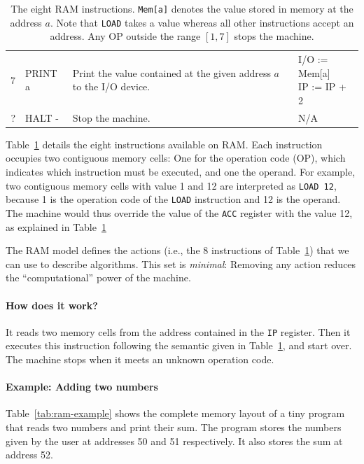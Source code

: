 \documentclass {aldast}
\begin{document}
\begin{table}[htbp]
\begin{center}
\begin{tabular}{r>{\ttfamily}lp{4cm}>{\ttfamily}p{3.5cm}}
      7  & PRINT a  & Print the value contained at the given address $a$ to the I/O device.                                       & \makecell[tl]{I/O := Mem[a]       \\ IP := IP + 2} \\[1cm]
      ?  & HALT -   & Stop the machine.                                                                                           & N/A                               \\
      \bottomrule
    \end{tabular}
  \end{center}
  \caption{The eight RAM instructions. \texttt{Mem[a]} denotes the
    value stored in memory at the address $a$. Note that \texttt{LOAD}
    takes a value whereas all other instructions accept an
    address. Any OP outside the range $[1, 7]$ stops the machine.}
  \label{tab:ram-instructions}
\end{table}

Table~\ref{tab:ram-instructions} details the eight instructions
available on RAM. Each instruction occupies two contiguous memory
cells: One for the operation code (OP), which indicates which
instruction must be executed, and one the operand. For example, two
contiguous memory cells with value 1 and 12 are interpreted as
\texttt{LOAD 12}, because 1 is the operation code of the \texttt{LOAD}
instruction and 12 is the operand. The machine would thus override the
value of the \texttt{ACC} register with the value 12, as explained in
Table~\ref{tab:ram-instructions}

\begin{takeaway}
  The RAM model defines the actions (i.e., the 8 instructions of
  Table~\ref{tab:ram-instructions}) that we can use to describe
  algorithms. This set is \emph{minimal}: Removing any action reduces
  the ``computational'' power of the machine.
\end{takeaway}

\paragraph{How does it work?} It reads two memory cells from the
address contained in the \texttt{IP} register. Then it executes this
instruction following the semantic given in
Table~\ref{tab:ram-instructions}, and start over. The machine stops
when it meets an unknown operation code.

\paragraph {Example: Adding two numbers}
Table~\ref{tab:ram-example} shows the complete memory layout of a tiny
program that reads two numbers and print their sum. The program stores
the numbers given by the user at addresses 50 and 51 respectively. It
also stores the sum at address 52.
\end{document}
